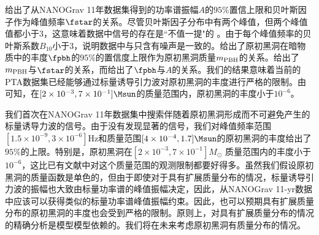 给出了从NANOGrav 11年数据集得到的功率谱振幅$A$的$95\%$置信上限和贝叶斯因子作为峰值频率$\fstar$的关系。尽管贝叶斯因子分布中有两个峰值，但两个峰值值都小于$3$，这意味着数据中信号的存在是``不值一提"的 \cite{BF}。由于每个峰值频率的贝叶斯系数$B_{10}$小于$3$，说明数据中与只含有噪声是一致的。给出了原初黑洞在暗物质中的丰度$\fpbh$的$95\%$的置信度上限作为原初黑洞质量$m_{\rm{PBH}}$的关系。给出了$m_{\rm{PBH}}$与$\fstar$的关系，而给出了$\fpbh$与$A$的关系。我们的结果意味着当前的PTA数据集已经能够通过标量诱导引力波对原初黑洞的丰度进行严格的限制。由可知，在$[2\times 10^{-3}, 7\times 10^{-1}] \Msun$的质量范围内，原初黑洞的丰度小于$10^{-6}$。


我们首次在NANOGrav 11年数据集中搜索伴随着原初黑洞形成而不可避免产生的标量诱导力波的信号。由于没有发现显著的信号，我们对峰值频率范围$[1.5\times 10^{-9}, 3\times 10^{-6}]$Hz和质量范围$[4\times10^{-4}, 1.7]\Msun$的原初黑洞的丰度给出了$95\%$的上限。特别是，原初黑洞在$[2 \times 10^{-3}, 7\times 10^{-1}] M_\odot$ 质量范围内的丰度小于$10^{-6}$，这比已有文献中对这个质量范围的观测限制都要好得多。虽然我们假设原初黑洞的质量函数是单色的，但由于即使对于具有扩展质量分布的情况，标量诱导引力波的振幅也大致由标量功率谱的峰值振幅决定，因此，从NANOGrav 11-yr数据中应该可以获得类似的标量功率谱峰值振幅约束。因此，也可以预期具有扩展质量分布的原初黑洞的丰度也会受到严格的限制。原则上，对具有扩展质量分布的情况的精确分析是模型模型依赖的。我们将在未来考虑原初黑洞有质量分布的情况。





